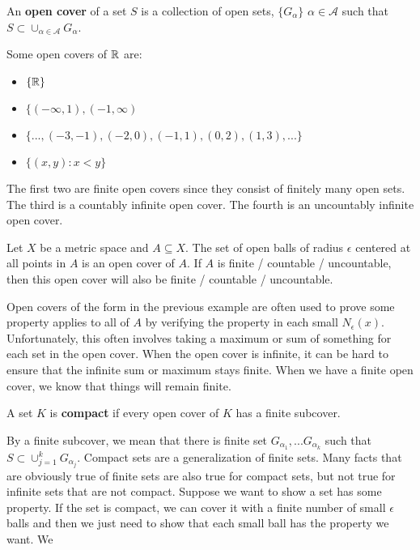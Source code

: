 \begin{definition}
  An \textbf{open cover} of a set $S$ is a collection of open sets,
  $\{G_\alpha\}$  $\alpha \in \mathcal{A}$ such that $S \subset
  \cup_{\alpha \in \mathcal{A}} G_\alpha$. 
\end{definition}
\begin{example}
  Some open covers of $\mathbb{R}$ are:
  \begin{itemize}
  \item $\{\mathbb{R}\}$ 
  \item $\{(-\infty, 1), (-1, \infty)$
  \item $\{..., (-3, -1), (-2, 0),(-1,1), (0,2), (1,3), ... \}$
  \item $\{(x,y) : x<y \}$
  \end{itemize}
  The first two are finite open covers since they consist of finitely
  many open sets. The third is a countably infinite open cover. The
  fourth is an uncountably infinite open cover. 
\end{example}
\begin{example}
  Let $X$ be a metric space and $A \subseteq X$. The set of open balls
  of radius $\epsilon$ centered at all points in $A$ is an open cover
  of $A$. If $A$ is finite / countable / uncountable, then this open
  cover will also be finite / countable / uncountable. 
\end{example}
Open covers of the form in the previous example are often used to
prove some property applies to all of $A$ by verifying the property in
each small $N_\epsilon(x)$. Unfortunately, this often involves taking
a maximum or sum of something for each set in the open cover. When the
open cover is infinite, it can be hard to ensure that the infinite sum
or maximum stays finite. When we have a finite open cover, we know
that things will remain finite. 
\begin{definition}
  A set $K$ is \textbf{compact} if every open cover of $K$ has a
  finite subcover. 
\end{definition}
By a finite subcover, we mean that there is finite set $G_{\alpha_1},
... G_{\alpha_k}$ such that $S \subset \cup_{j=1}^k
G_{\alpha_j}$. Compact sets are a generalization of finite sets. Many
facts that are obviously true of finite sets are also true for compact
sets, but not true for infinite sets that are not compact. Suppose we
want to show a set has some property. If the set is compact, we can
cover it with a finite number of small $\epsilon$ balls and then we
just need to show that each small ball has the property we want. We
